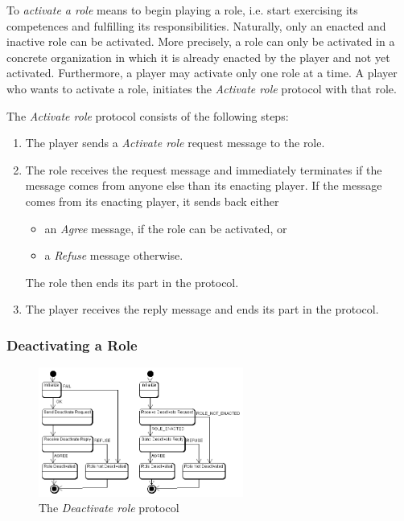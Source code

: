 To \textit{activate a role} means to begin playing a role, i.e. start exercising its competences and fulfilling its responsibilities.
Naturally, only an enacted and inactive role can be activated.
More precisely, a role can only be activated in a concrete organization in which it is already enacted by the player and not yet activated.
Furthermore, a player may activate only one role at a time.
A player who wants to activate a role, initiates the \textit{Activate role} protocol with that role.

The \textit{Activate role} protocol consists of the following steps:
\begin{enumerate}
	\item The player sends a \textit{Activate role} request message to the role.
	\item The role receives the request message and immediately terminates if the message comes from anyone else than its enacting player.
	If the message comes from its enacting player, it sends back either
	\begin{itemize}
		\item an \textit{Agree} message, if the role can be activated, or
		\item a \textit{Refuse} message otherwise.
	\end{itemize}
	The role then ends its part in the protocol.
	\item The player receives the reply message and ends its part in the protocol.
\end{enumerate}

\subsubsection{Deactivating a Role}

\begin{figure}[ht]
	\centering
	\includegraphics[width=0.6\textwidth]{images/thespian/deactivate-role-protocol.png}
	\caption{The \textit{Deactivate role} protocol}
	\label{figure:thespian-deactivate-role-protocol}
\end{figure}

